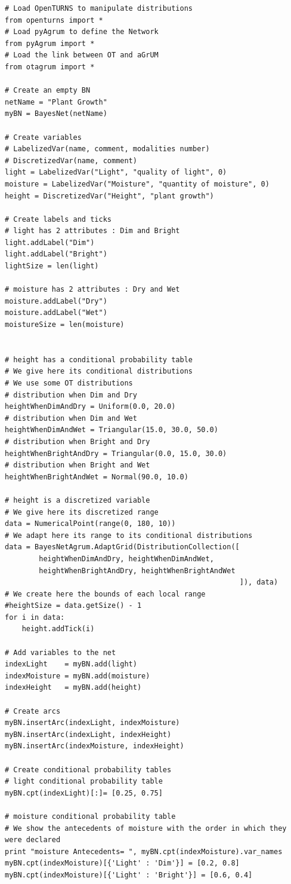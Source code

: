 \begin{lstlisting}
# Load OpenTURNS to manipulate distributions
from openturns import *
# Load pyAgrum to define the Network
from pyAgrum import *
# Load the link between OT and aGrUM
from otagrum import *

# Create an empty BN
netName = "Plant Growth"
myBN = BayesNet(netName)

# Create variables
# LabelizedVar(name, comment, modalities number)
# DiscretizedVar(name, comment)
light = LabelizedVar("Light", "quality of light", 0)
moisture = LabelizedVar("Moisture", "quantity of moisture", 0)
height = DiscretizedVar("Height", "plant growth")

# Create labels and ticks
# light has 2 attributes : Dim and Bright
light.addLabel("Dim")
light.addLabel("Bright")
lightSize = len(light)

# moisture has 2 attributes : Dry and Wet
moisture.addLabel("Dry")
moisture.addLabel("Wet")
moistureSize = len(moisture)


# height has a conditional probability table
# We give here its conditional distributions
# We use some OT distributions
# distribution when Dim and Dry
heightWhenDimAndDry = Uniform(0.0, 20.0)
# distribution when Dim and Wet
heightWhenDimAndWet = Triangular(15.0, 30.0, 50.0)
# distribution when Bright and Dry
heightWhenBrightAndDry = Triangular(0.0, 15.0, 30.0)
# distribution when Bright and Wet
heightWhenBrightAndWet = Normal(90.0, 10.0)

# height is a discretized variable
# We give here its discretized range
data = NumericalPoint(range(0, 180, 10))
# We adapt here its range to its conditional distributions
data = BayesNetAgrum.AdaptGrid(DistributionCollection([
        heightWhenDimAndDry, heightWhenDimAndWet, 
        heightWhenBrightAndDry, heightWhenBrightAndWet
                                                       ]), data)
# We create here the bounds of each local range
#heightSize = data.getSize() - 1
for i in data:
    height.addTick(i)

# Add variables to the net
indexLight    = myBN.add(light)
indexMoisture = myBN.add(moisture)
indexHeight   = myBN.add(height)

# Create arcs
myBN.insertArc(indexLight, indexMoisture)
myBN.insertArc(indexLight, indexHeight)
myBN.insertArc(indexMoisture, indexHeight)

# Create conditional probability tables
# light conditional probability table
myBN.cpt(indexLight)[:]= [0.25, 0.75]

# moisture conditional probability table
# We show the antecedents of moisture with the order in which they were declared
print "moisture Antecedents= ", myBN.cpt(indexMoisture).var_names
myBN.cpt(indexMoisture)[{'Light' : 'Dim'}] = [0.2, 0.8]
myBN.cpt(indexMoisture)[{'Light' : 'Bright'}] = [0.6, 0.4]


\end{lstlisting}
